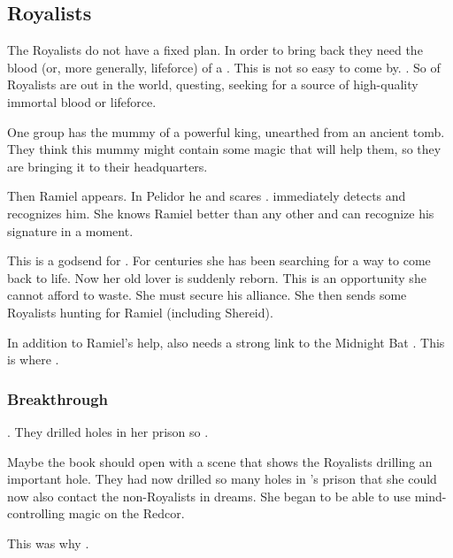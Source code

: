 \subsection{Royalists}
The Royalists do not have a fixed plan. 
In order to bring \Belzir{} back they need the blood (or, more generally, lifeforce) of a \resphan. 
This is not so easy to come by. 
\Shiaraid{} . 
So  of Royalists are out in the world, questing, seeking for a source of high-quality immortal blood or lifeforce. 

One group has the mummy of a powerful \quiljaaran{} king, unearthed from an ancient tomb. 
They think this mummy might contain some magic that will help them, so they are bringing it to their headquarters. 

Then Ramiel appears.
In Pelidor he  and scares \Nzessuacrith. 
\Shiaraid{} immediately detects and recognizes him. 
She knows Ramiel better than any other and can recognize his \vertex{} signature in a moment. 

This is a godsend for \Shiaraid. 
For centuries she has been searching for a way to come back to life. 
Now her old lover is suddenly reborn. 
This is an opportunity she cannot afford to waste. 
She must secure his alliance. 
She then sends some Royalists hunting for Ramiel (including Shereid). 

In addition to Ramiel's help, \Shiaraid{} also needs a strong link to the Midnight Bat \matrix. 
This is where . 





\subsubsection{Breakthrough}
\Belzir {}.
They drilled holes in her prison so . 

Maybe the book should open with a scene that shows the Royalists drilling an important hole. 
They had now drilled so many holes in \Belzir's prison that she could now also contact the non-Royalists in dreams.
She began to be able to use mind-controlling magic on the Redcor. 

This was why . 





